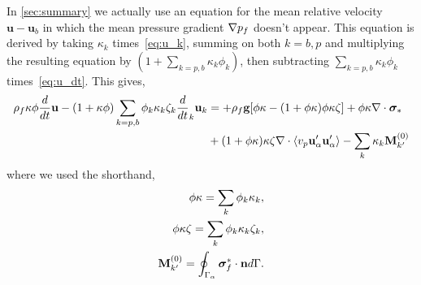 In \ref{sec:summary} we actually use an equation for the mean relative velocity $\textbf{u}-\textbf{u}_b$ in which the mean pressure gradient $\mathbf{\nabla} p_f$ doesn't appear. 
This equation is derived by taking $\kappa_k$ times~\ref{eq:u_k}, summing on both $k=b,p$ and multiplying the resulting equation by $(1+\sum_{k=p,b}\kappa_k\phi_k)$, then subtracting $\sum_{k=p,b}\kappa_k\phi_k$ times~\ref{eq:u_dt}. 
This gives, 
\begin{align}
    \rho_f \kappa \phi \ddt \textbf{u}
    - (1+\kappa\phi) \sum_{k=p,b}\phi_k\kappa_k\zeta_k \ddt_k \textbf{u}_k
    &=
    +\rho_f \textbf{g}[\phi \kappa - (1+\phi\kappa)\phi \kappa\zeta]
    +\phi\kappa\div \bm\sigma_*\nonumber \\
    &+(1+\phi\kappa)\kappa\zeta\div \avg{v_p \textbf{u}_\alpha' \textbf{u}_\alpha'}
    - \sum_k \kappa_k  \textbf{M}_{k'}^{(0)}
    \label{eq:Du}
\end{align}
where we used the shorthand,
\begin{align*}
    \phi \kappa =\sum_k \phi_k \kappa_k,\\
    \phi \kappa \zeta =\sum_k \phi_k \kappa_k \zeta_k, \\
    \textbf{M}_{k'}^{(0)} = \oint_{\Gamma_{\alpha}} \bm{\sigma}_f^* \cdot \textbf{n} d\Gamma.
\end{align*}

